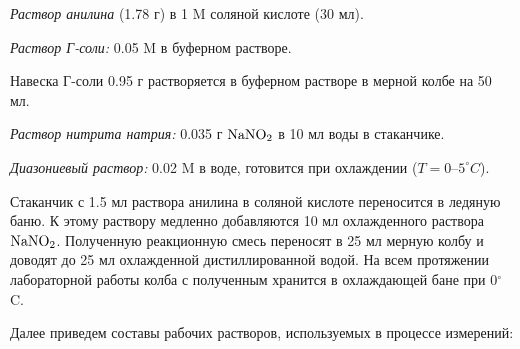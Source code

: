 \documentclass[a4paper]{article}
\begin{document}
 \hspace{0.1 cm} \textit{Раствор анилина} (1.78 г) в 1 M соляной кислоте (30 мл). \par \vspace{0.5 cm}


\textbf{}
\par \vspace{0.2 cm}

 \hspace{0.1 cm} \textit{Раствор Г-соли:} 0.05 M в буферном растворе. \par \vspace{0.2 cm}
Навеска Г-соли 0.95 г растворяется в буферном растворе в мерной колбе на 50 мл. \par \vspace{0.2 cm}

 \hspace{0.1 cm} \textit{Раствор нитрита натрия:} 0.035 г $\rm NaNO_2$ в 10 мл воды в стаканчике. \par \vspace{0.2 cm}

 \hspace{0.1 cm} \textit{Диазониевый раствор:} 0.02 M в воде, готовится при охлаждении ($T=0$--$5^{\circ}C$). \par \vspace{0.2 cm}
Стаканчик с 1.5 мл раствора анилина в соляной кислоте переносится в ледяную баню. К этому раствору медленно добавляются 10 мл охлажденного раствора $\rm NaNO_2$. Полученную реакционную смесь переносят в 25 мл мерную колбу и доводят до 25 мл охлажденной дистиллированной водой. На всем протяжении лабораторной работы колба с полученным хранится в охлаждающей бане при 0$^{\circ}$C.
\par \vspace{0.2 cm}
Далее приведем составы рабочих растворов, используемых в процессе измерений:
\end{document}

